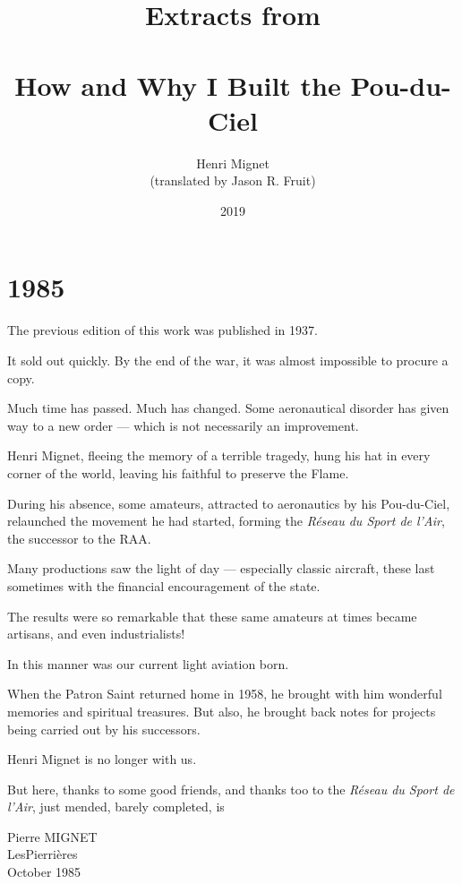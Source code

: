 \documentclass{book}
\title{{\small Extracts from}\\ \vspace{12pt}{\Huge Aerial
    Sport}\\{\Large How and Why I Built the Pou-du-Ciel}}
\author{Henri Mignet\\
  {\small (translated by Jason R. Fruit)}}
\date{2019}
\begin{document}
\maketitle
\tableofcontents

\selectfont

\chapter*{1985}

The previous edition of this work was published in 1937.

It sold out quickly.  By the end of the war, it was almost impossible
to procure a copy.

Much time has passed.  Much has changed.  Some aeronautical disorder
has given way to a new order --- which is not necessarily an
improvement.

Henri Mignet, fleeing the memory of a terrible tragedy, hung his hat
in every corner of the world, leaving his faithful to preserve the
Flame.

During his absence, some amateurs, attracted to aeronautics by his
Pou-du-Ciel, relaunched the movement he had started, forming the
\textit{R\'eseau du Sport de l'Air}, the successor to the RAA.

Many productions saw the light of day --- especially classic aircraft,
these last sometimes with the financial encouragement of the state.

The results were so remarkable that these same amateurs at times
became artisans, and even industrialists!

In this manner was our current light aviation born.

When the Patron Saint returned home in 1958, he brought with him
wonderful memories and spiritual treasures.  But also, he brought back
notes for projects being carried out by his successors.

Henri Mignet is no longer with us.

\begin{samepage}
  
But here, thanks to some good friends, and thanks too to the
\textit{R\'eseau du Sport de l'Air}, just mended, barely completed, is


\begin{flushright}
  Pierre MIGNET\\LesPierri\`eres\\October 1985
\end{flushright}

\end{samepage}
\end{document}
